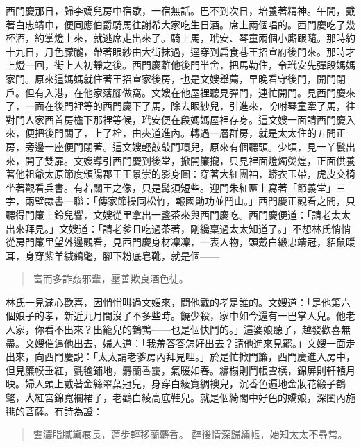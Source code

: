 西門慶那日，歸李嬌兒房中宿歇，一宿無話。巴不到次日，培養著精神。午間，戴著白忠靖巾，便同應伯爵騎馬往謝希大家吃生日酒。席上兩個唱的。西門慶吃了幾杯酒，約掌燈上來，就逃席走出來了。騎上馬，玳安、琴童兩個小廝跟隨。那時約十九日，月色朦朧，帶著眼紗由大街抹過，逕穿到扁食巷王招宣府後門來。那時才上燈一回，街上人初靜之後。西門慶離他後門半舍，把馬勒住，令玳安先彈段媽媽家門。原來這媽媽就住著王招宣家後房，也是文嫂舉薦，早晚看守後門，開門閉戶。但有入港，在他家落腳做窩。文嫂在他屋裡聽見彈門，連忙開門。見西門慶來了，一面在後門裡等的西門慶下了馬，除去眼紗兒，引進來，吩咐琴童牽了馬，往對門人家西首房檐下那裡等候，玳安便在段媽媽屋裡存身。這文嫂一面請西門慶入來，便把後門關了，上了栓，由夾道進內。轉過一層群房，就是太太住的五間正房，旁邊一座便門閉著。這文嫂輕敲敲門環兒，原來有個聽頭。少頃，見一丫鬟出來，開了雙扉。文嫂導引西門慶到後堂，掀開簾攏，只見裡面燈燭熒煌，正面供養著他祖爺太原節度頒陽郡王王景崇的影身圖：穿著大紅團袖，蟒衣玉帶，虎皮交椅坐著觀看兵書。有若關王之像，只是髯須短些。迎門朱紅匾上寫著「節義堂」三字，兩壁隸書一聯：「傳家節操同松竹，報國勛功並鬥山。」西門慶正觀看之間，只聽得門簾上鈴兒響，文嫂從里拿出一盞茶來與西門慶吃。西門慶便道：「請老太太出來拜見。」文嫂道：「請老爹且吃過茶著，剛纔稟過太太知道了。」不想林氏悄悄從房門簾里望外邊觀看，見西門慶身材凜凜，一表人物，頭戴白緞忠靖冠，貂鼠暖耳，身穿紫羊絨鶴氅，腳下粉底皂靴，就是個——
\begin{quote}
富而多詐姦邪輩，壓善欺良酒色徒。
\end{quote}

林氏一見滿心歡喜，因悄悄叫過文嫂來，問他戴的孝是誰的。文嫂道：「是他第六個娘子的孝，新近九月間沒了不多些時。饒少殺，家中如今還有一巴掌人兒。他老人家，你看不出來？出籠兒的鵪鶉——也是個快鬥的。」這婆娘聽了，越發歡喜無盡。文嫂催逼他出去，婦人道：「我羞答答怎好出去？請他進來見罷。」文嫂一面走出來，向西門慶說：「太太請老爹房內拜見哩。」於是忙掀門簾，西門慶進入房中，但見簾幙垂紅，氈毺鋪地，麝蘭香靄，氣暖如春。繡榻則鬥帳雲橫，錦屏則軒轅月映。婦人頭上戴著金絲翠葉冠兒，身穿白綾寬綢襖兒，沉香色遍地金妝花緞子鶴氅，大紅宮錦寬襴裙子，老鸛白綾高底鞋兒。就是個綺閣中好色的嬌娘，深閨內施毴的菩薩。有詩為證：
\begin{quote}
雲濃脂膩黛痕長，蓮步輕移蘭麝香。
醉後情深歸繡帳，始知太太不尋常。
\end{quote}

